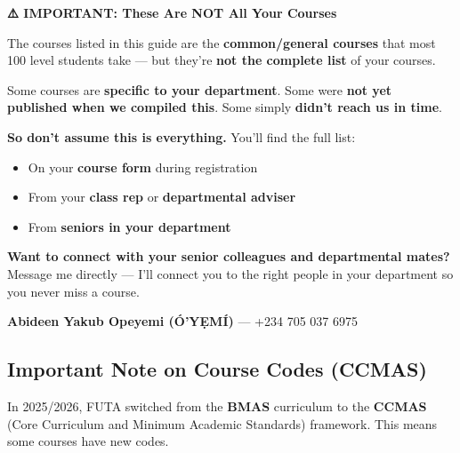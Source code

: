 \documentclass[11pt,a4paper]{article}
\begin{document}
\begin{warningbox}
    \textbf{\color{warningText}\Large ⚠️ IMPORTANT: These Are NOT All Your Courses}

    \vspace{0.5em}

    The courses listed in this guide are the \textbf{common/general courses} that most 100 level students take --- but they're \textbf{not the complete list} of your courses.

    \vspace{0.5em}

    Some courses are \textbf{specific to your department}. Some were \textbf{not yet published when we compiled this}. Some simply \textbf{didn't reach us in time}.

    \vspace{0.5em}

    \textbf{So don't assume this is everything.} You'll find the full list:

    \begin{itemize}[leftmargin=1.5em, itemsep=0.3em]
        \item On your \textbf{course form} during registration
        \item From your \textbf{class rep} or \textbf{departmental adviser}
        \item From \textbf{seniors in your department}
    \end{itemize}

    \vspace{0.5em}

    \textbf{Want to connect with your senior colleagues and departmental mates?} Message me directly --- I'll connect you to the right people in your department so you never miss a course.

    \vspace{0.5em}

    \textbf{Abideen Yakub Opeyemi (Ó'YẸMÍ)} --- +234 705 037 6975
\end{warningbox}

\subsection*{Important Note on Course Codes (CCMAS)}

In 2025/2026, FUTA switched from the \textbf{BMAS} curriculum to the \textbf{CCMAS} (Core Curriculum and Minimum Academic Standards) framework. This means some courses have new codes.
\end{document}
